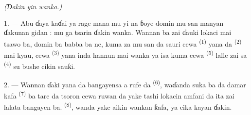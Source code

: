 \VUsaut{4.0mm}
{\centering\fontsize{10.2pt}{10.2pt}\selectfont{} \textit{(Ɗakin yin wanka.)}\par}
\VUsaut{3.0mm}

1. --- Abu ɗaya kaɗai ya rage mana mu yi na ɓoye domin mu san manyan
ɗakunan gidan : mu ga tsarin ɗakin wanka. Wannan ba zai ɗauki lokaci
mai tsawo ba, domin ba babba ba ne, kuma za mu san da sauri cewa
 \textsuperscript{(1)} yana da  \textsuperscript{(2)} mai kyau, cewa 
\textsuperscript{(3)} yana inda hannun mai wanka ya isa kuma cewa
 \textsuperscript{(5)} lalle zai sa
 \textsuperscript{(4)} su bushe cikin sauƙi.

2. --- Wannan ɗaki yana da bangayensa a rufe da 
\textsuperscript{(6)}, waɗanda suka ba da damar kafa 
\textsuperscript{(7)} ba tare da tsoron cewa ruwan da yake tashi lokacin
amfani da ita zai lalata bangayen ba. 
\textsuperscript{(8)}, wanda yake aikin wankan ƙafa, ya cika kayan
ɗakin.

\VUsaut{6.0mm}
\VUfilet{22mm}
